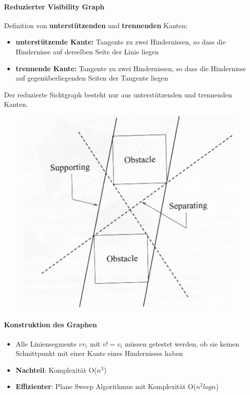 \paragraph{Reduzierter Visibility Graph}
Definition von \textbf{unterstützenden} und \textbf{trennenden} Kanten:
\begin{itemize}
	\item \textbf{unterstützende Kante:} Tangente zu zwei Hindernissen, so dass die Hindernisse auf derselben Seite der Linie liegen
	\item \textbf{trennende Kante:} Tangente zu zwei Hindernissen, so dass die Hindernisse auf gegenüberliegenden Seiten der Tangente liegen
\end{itemize}
Der reduzierte Sichtgraph besteht nur aus unterstützenden und trennenden Kanten.
\begin{figure}[H]
	\begin{center}
		\includegraphics[scale=0.4]{Resources/PNG/SichtGraphReduziert}
		\caption{}
		\label{fig:PNG/SichtGraphReduziert.PNG}
	\end{center}
\end{figure}
\paragraph{Konstruktion des Graphen}
\begin{itemize}
	\item Alle Liniensegmente $vv_i$ mit $v != v_i$ müssen getestet werden, ob sie keinen Schnittpunkt mit einer Kante eines Hindernisses haben
	\item \textbf{Nachteil}: Komplexität O($n^3$)
	\item \textbf{Effizienter}: Plane Sweep Algorithmus mit Komplexität O($n^2 log n$)
\end{itemize}
\newpage
